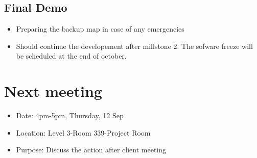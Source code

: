 \documentclass[11pt, a4paper]{article}
\begin{document}
\subsection{Final Demo}
\begin{itemize}
	\item Preparing the backup map in case of any emergencies
	\item Should continue the developement after millstone 2. The sofware freeze will be scheduled at the end of october.
\end{itemize}





\section{Next meeting}
\begin{itemize}
\item Date: 4pm-5pm, Thursday, 12 Sep
\item Location: Level 3-Room 339-Project Room
\item Purpose: Discuss the action after client meeting
\end{itemize}

\vspace*{10pt}
\end{document}
